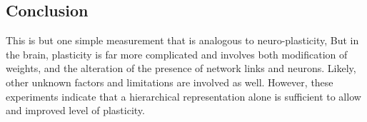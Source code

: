 \documentclass[12pt]{article}
\begin{document}
\begin{doublespacing}
	\subsection{Conclusion}
	This is but one simple measurement that is analogous to neuro-plasticity, But in the brain, plasticity is far more complicated and involves both modification of weights, and the alteration of the presence of network links and neurons. Likely, other unknown factors and limitations are involved as well. However, these experiments indicate that a hierarchical representation alone is sufficient to allow and improved level of plasticity. 

\end{doublespacing}

\nocite{huiskes08}

\singlespacing


\end{document}
